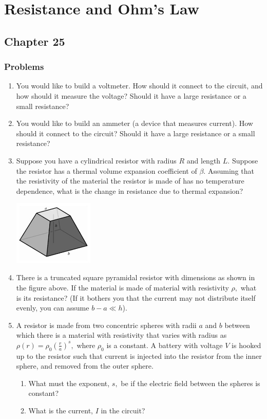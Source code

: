 \documentclass[12pt]{book}
\begin{document}
\chapter{Resistance and Ohm's Law}

\section{Chapter 25}

\subsection{Problems}
\begin{enumerate}
 \item You would like to build a voltmeter. How should it connect to the circuit, and how should it measure the voltage? Should it have a large resistance or a small resistance?
 \item You would like to build an ammeter (a device that measures current). How should it connect to the circuit? Should it have a large resistance or a small resistance?
  \item Suppose you have a cylindrical resistor with radius $R$ and length $L.$ Suppose the resistor has a thermal volume expansion coefficient of $\beta.$ Assuming that the resistivity of the material the resistor is made of has no temperature dependence, what is the change in resistance due to thermal expansion?
  \begin{center}
\includegraphics[width=0.3\textwidth]{figure12.jpg}
\end{center}

 \item There is a truncated square pyramidal resistor with dimensions as shown in the figure above. If the material is made of material with resistivity $\rho,$ what is its resistance? (If it bothers you that the current may not distribute itself evenly, you can assume $b-a\ll h$).
 
 \pagebreak
 
 \item A resistor is made from two concentric spheres with radii $a$ and $b$ between which there is a material with resistivity that varies with radius as $\rho(r) = \rho_0 \left(\frac{r}{a}\right)^s,$ where $\rho_0$ is a constant. A battery with voltage $V$ is hooked up to the resistor such that current is injected into the resistor from the inner sphere, and removed from the outer sphere.
\begin{enumerate}
 \item What must the exponent, $s,$ be if the electric field between the spheres is constant?
 \item What is the current, $I$ in the circuit?
\end{enumerate}

\end{enumerate}
\end{document}
